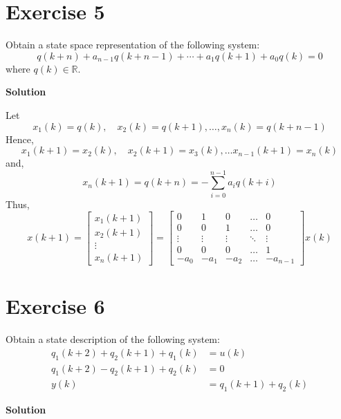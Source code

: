 \documentclass[12pt,a4paper]{article}
\begin{document}
\section*{Exercise 5}
Obtain a state space representation of the following system:
\[
q(k+n)+a_{n-1}q(k+n-1)+\cdots+a_1q(k+1)+a_0q(k)=0
\]
where $q(k)\in\mathbb{R}$.

\textbf{Solution}

Let 
\[
x_1(k) = q(k), \quad x_2(k) = q(k + 1), \dots , x_n(k) = q(k + n - 1)
\]
Hence,
\[
x_1(k + 1) = x_2(k), \quad x_2(k + 1) = x_3(k), \dots x_{n - 1}(k +1) = x_{n}(k)
\]
and, 
\[
x_n(k + 1) = q(k + n) = -\sum_{i = 0}^{n - 1} a_iq(k + i)
\]
Thus, 
\[
x(k + 1) = \begin{bmatrix}
	x_1(k +1 ) \\ x_2(k + 1) \\ \vdots \\ x_n(k + 1)
\end{bmatrix} =  \begin{bmatrix}
0 & 1 & 0 & \dots & 0 \\
0 & 0 & 1 & \dots & 0 \\
\vdots & \vdots & \vdots &  \ddots & \vdots \\
0 & 0 & 0 & \dots & 1 \\
-a_0 & -a_1 & -a_2 & \dots & -a_{n -1 }
\end{bmatrix} x(k)
\]

\section*{Exercise 6}
Obtain a state description of the following system:
\[
\begin{aligned}
q_1(k+2)+q_2(k+1)+q_1(k)&=u(k)\\
q_1(k+2)-q_2(k+1)+q_2(k)&=0\\
y(k)&=q_1(k+1)+q_2(k)
\end{aligned}
\]

\textbf{Solution}
\end{document}
